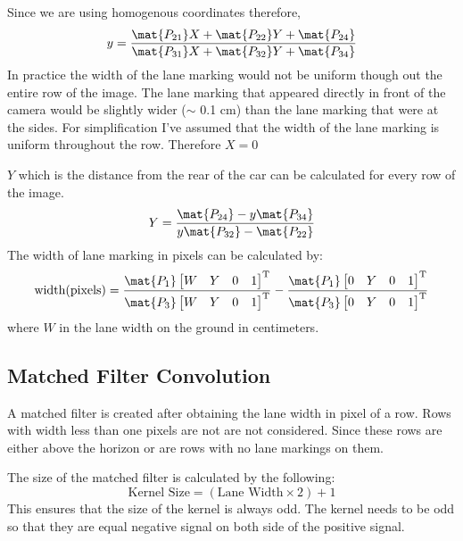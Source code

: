 Since we are using homogenous coordinates therefore, 
\begin{eqnarray*}
y = \frac {\mat{P_{21}}X + \mat{P_{22}}Y + \mat{P_{24}}} 
                   {\mat{P_{31}}X + \mat{P_{32}}Y + \mat{P_{34}}}
\end{eqnarray*}
In practice the width of the lane marking would not be uniform though out the 
entire row of the image. The lane marking that appeared directly in front of the 
camera would be slightly wider ($\sim$ 0.1 cm) than the lane marking that were 
at the sides. For simplification I've assumed that the width of the lane marking 
is uniform throughout the row. Therefore $X = 0$

$Y$ which is the distance from the 
rear of the car can be calculated for every row of the image. 
\begin{eqnarray*}
Y = \frac{\mat{P_{24}} - y\mat{P_{34}}} 
                  {y\mat{P_{32}} - \mat{P_{22}}}
\end{eqnarray*}
The width of lane marking in pixels can be calculated by: 
\begin{eqnarray*}
\mathrm{width(pixels)} = 
\frac {\mat{P_{1}}\begin{bmatrix}W&Y&0&1\end{bmatrix}^{\mathrm{T}}}
      {\mat{P_{3}}\begin{bmatrix}W&Y&0&1\end{bmatrix}^{\mathrm{T}}}
- 
\frac {\mat{P_{1}}\begin{bmatrix}0&Y&0&1\end{bmatrix}^{\mathrm{T}}}
      {\mat{P_{3}}\begin{bmatrix}0&Y&0&1\end{bmatrix}^{\mathrm{T}}} 
\end{eqnarray*}
where $W$ in the lane width on the ground in centimeters. 

\subsection{Matched Filter Convolution}
A matched filter is created after obtaining the lane width in pixel of a row.
Rows with width less than one pixels are not are not considered. Since these 
rows are either above the horizon or are rows with no lane markings on them.

The size of the matched filter is calculated by the following:
\[ \textrm{Kernel Size} = (\textrm{Lane Width} \times 2) + 1\] 
This ensures that the size of the kernel is always odd. The kernel needs to be 
odd so that they are equal negative signal on both side of the positive 
signal. 


